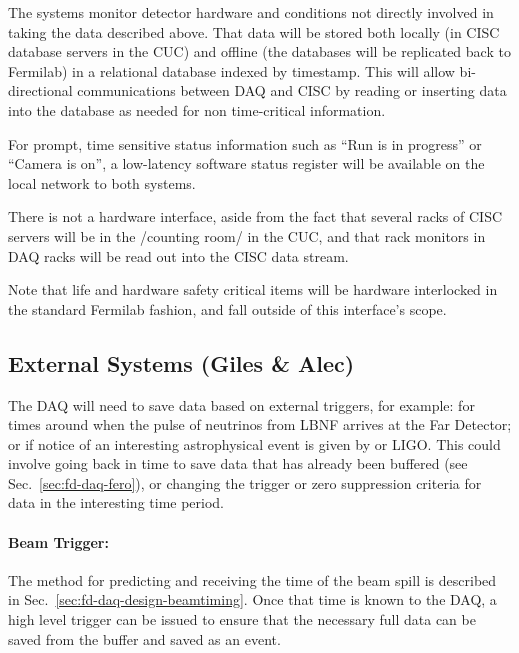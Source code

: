 The  systems monitor detector hardware and conditions not
directly involved in taking the data described above.
That data will be stored both locally (in CISC database servers in the
CUC) and offline (the databases will be replicated back to Fermilab)
in a relational database indexed by timestamp.
This will allow bi-directional communications between DAQ and CISC by
reading or inserting data into the database as needed for non
time-critical information.  

For prompt, time sensitive status information such as ``Run is in
progress'' or ``Camera is on'', a low-latency software status register
will be available on the local network to both systems.

There is not a hardware interface, aside from the fact that several
racks of CISC servers will be in the /counting room/ in the CUC, and that rack
monitors in DAQ racks will be read out into the CISC data stream.

Note that life and hardware safety critical items will be hardware
interlocked in the standard Fermilab fashion, and fall outside of this
interface's scope.


\subsection{External Systems (Giles \& Alec)}
\label{sec:fd-daq-intfc-ext}


The DAQ will need to save data based on external triggers, for
example: for times around when the pulse of neutrinos from LBNF
arrives at the Far Detector; or if notice of an interesting
astrophysical event is given by \cite{snews} or LIGO.
This could involve going back in time to save data that has already
been buffered (see Sec.~\ref{sec:fd-daq-fero}), or changing the trigger
or zero suppression criteria for data in the interesting time period.


\paragraph{Beam Trigger:} The method for predicting and receiving the
time of the beam spill is described in
Sec.~\ref{sec:fd-daq-design-beamtiming}.
Once that time is known to the DAQ, a high level trigger can be issued
to ensure that the necessary full data can be saved from the buffer
and saved as an event.

